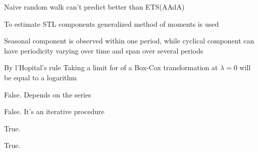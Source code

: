 
\begin{question}
\begin{answerlist}
  \item Naive random walk can't predict better than ETS(AAdA)
  \item To estimate STL components generalized method of moments is used
  \item Seasonal component is observed within one period, while cyclical component can have periodicity varying over time and span over several periods
  \item By l'Hopital's rule Taking a limit for of a Box-Cox transformation at \(\lambda=0\) will be equal to a logarithm
\end{answerlist}
\end{question}

\begin{solution}
\begin{answerlist}
  \item False. Depends on the series
  \item False. It's an iterative procedure
  \item True.
  \item True.
\end{answerlist}
\end{solution}

